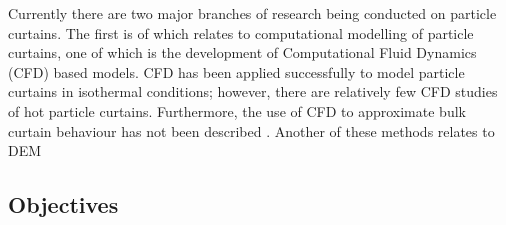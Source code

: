 \documentclass[12pt]{article}
\newcommand{\ts}{\textsuperscript}
\newcommand{\pe}{\vspace{0.3cm}}
\newcommand{\mycite}[1]{\ts{\cite{#1}}}
\begin{document}
\pe 


\begin{comment}
Particle curtains are defined as a continuous stream of particles made to fall in a curtain-like
shape through a gaseous medium. They are employed in a wide variety of industries as heat
exchangers for particulate mediums, due primarily to their simplicity and low operational costs \ts{\cite{AfsharCurtainPhd, AndrewLeePhd}}. Examples include the flighted rotary dryer (FRD) and the hopper, which are common in mineral and pharmaceutical industries. However, particle curtains are steadily emerging in promising new renewable energy technologies for use in concentrating solar power (CSP) plants. These solar particle receiver designs are currently in the early demonstration phase, delivering improved thermal efficiency through their direct storage of heat within sand-like particles \ts{\cite{christian2015system, viebahn2011potential}}.
\end{comment}


Currently there are two major branches of research being conducted on particle curtains. The first is of which relates to computational modelling of particle curtains, one of which is the development of Computational Fluid Dynamics (CFD) based models. CFD has been applied successfully to model particle curtains in isothermal conditions; however, there are relatively few CFD studies of hot
particle curtains. Furthermore, the use of CFD to approximate bulk curtain behaviour has not been
described \mycite{AfsharCurtainPhd}. Another of these methods relates to DEM










\subsection{Objectives}
\end{document}
